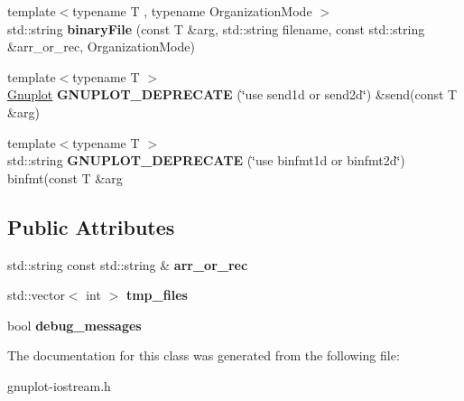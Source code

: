 \begin{DoxyCompactItemize}
\item 
\mbox{\label{classgnuplotio_1_1Gnuplot_ad90501e6dbab5379abcd76fd0e2e4ef1}} 
{\footnotesize template$<$typename T , typename Organization\+Mode $>$ }\\std\+::string {\bfseries binary\+File} (const T \&arg, std\+::string filename, const std\+::string \&arr\+\_\+or\+\_\+rec, Organization\+Mode)
\item 
\mbox{\label{classgnuplotio_1_1Gnuplot_a4e730c762706c7235eb105bcb56ad185}} 
{\footnotesize template$<$typename T $>$ }\\\hyperlink{classgnuplotio_1_1Gnuplot}{Gnuplot} {\bfseries G\+N\+U\+P\+L\+O\+T\+\_\+\+D\+E\+P\+R\+E\+C\+A\+TE} (\char`\"{}use send1d or send2d\char`\"{}) \&send(const T \&arg)
\item 
\mbox{\label{classgnuplotio_1_1Gnuplot_aeb3ba94ed04ecd46b55f89591ba23e7c}} 
{\footnotesize template$<$typename T $>$ }\\std\+::string {\bfseries G\+N\+U\+P\+L\+O\+T\+\_\+\+D\+E\+P\+R\+E\+C\+A\+TE} (\char`\"{}use binfmt1d or binfmt2d\char`\"{}) binfmt(const T \&arg
\end{DoxyCompactItemize}
\subsection*{Public Attributes}
\begin{DoxyCompactItemize}
\item 
\mbox{\label{classgnuplotio_1_1Gnuplot_a2d194dbd4d2f3475ff6f9b8384e62a9f}} 
std\+::string const std\+::string \& {\bfseries arr\+\_\+or\+\_\+rec}
\item 
\mbox{\label{classgnuplotio_1_1Gnuplot_a92a4f6322e486de17db4507a5fc77348}} 
std\+::vector$<$ int $>$ {\bfseries tmp\+\_\+files}
\item 
\mbox{\label{classgnuplotio_1_1Gnuplot_a63e08bfd0cd02937d895ecfb6180107c}} 
bool {\bfseries debug\+\_\+messages}
\end{DoxyCompactItemize}


The documentation for this class was generated from the following file\+:\begin{DoxyCompactItemize}
\item 
gnuplot-\/iostream.\+h\end{DoxyCompactItemize}
